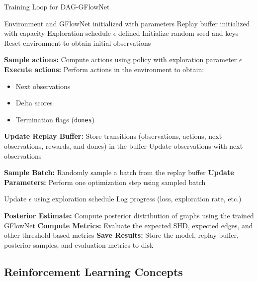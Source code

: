 \documentclass{lxaiproposal}
\begin{document}
    \begin{algorithm}[H]
        \caption{Training Loop for DAG-GFlowNet}
        \begin{algorithmic}[1]
            \Require Environment and GFlowNet initialized with parameters
            \Require Replay buffer initialized with capacity
            \Require Exploration schedule $\epsilon$ defined
            \State Initialize random seed and keys
            \State Reset environment to obtain initial observations

                \State \textbf{Sample actions:} Compute actions using policy with exploration parameter $\epsilon$
                \State \textbf{Execute actions:} Perform actions in the environment to obtain:
                \begin{itemize}
                    \item Next observations
                    \item Delta scores
                    \item Termination flags (\texttt{dones})
                \end{itemize}
                \State \textbf{Update Replay Buffer:} Store transitions (observations, actions, next observations, rewards, and dones) in the buffer
                \State Update observations with next observations

                    \State \textbf{Sample Batch:} Randomly sample a batch from the replay buffer
                    \State \textbf{Update Parameters:} Perform one optimization step using sampled batch
                \EndIf

                \State Update $\epsilon$ using exploration schedule
                \State Log progress (loss, exploration rate, etc.)
            \EndFor

            \State \textbf{Posterior Estimate:} Compute posterior distribution of graphs using the trained GFlowNet
            \State \textbf{Compute Metrics:} Evaluate the expected SHD, expected edges, and other threshold-based metrics
            \State \textbf{Save Results:} Store the model, replay buffer, posterior samples, and evaluation metrics to disk
        \end{algorithmic}\label{alg:training_loop}
    \end{algorithm}

    \subsection{Reinforcement Learning Concepts}\label{app:rl_concepts}
    \vspace*{-3mm}
\end{document}
